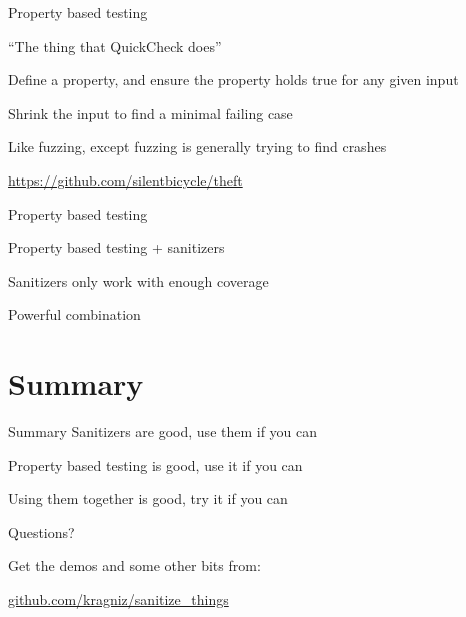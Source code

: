 \documentclass[10pt]{beamer}
\begin{document}
\begin{frame}[fragile]{Property based testing}
 
 ``The thing that QuickCheck does''
 
 Define a property, and ensure the property holds true for any given input
 
 Shrink the input to find a minimal failing case
 
 Like fuzzing, except fuzzing is generally trying to find crashes
 
 \url{https://github.com/silentbicycle/theft}

\end{frame}

\begin{frame}[fragile]{Property based testing}
 
 Property based testing + sanitizers
 
 Sanitizers only work with enough coverage
 
 Powerful combination
 
\end{frame}

\section{Summary}

\begin{frame}[fragile]{Summary}
 Sanitizers are good, use them if you can
 
 Property based testing is good, use it if you can
 
 Using them together is good, try it if you can

\end{frame}


\begin{frame}{Questions?}

  Get the demos and some other bits from:

  \begin{center}\url{github.com/kragniz/sanitize_things}\end{center}

\end{frame}
\end{document}
